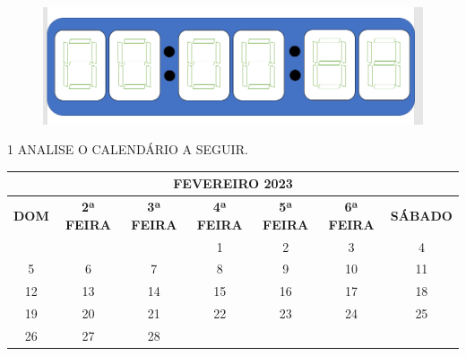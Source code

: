 \begin{figure}[htpb!]
\centering
\includegraphics[width=.8\textwidth]{media/image44.png}
\end{figure}


\pagebreak
{}

\num{1} ANALISE O CALENDÁRIO A SEGUIR.

\begin{center}
\begin{tabular}{|ccccccc|}
\hline
\multicolumn{7}{|c|}{\textbf{FEVEREIRO 2023}} \\ \hline
\multicolumn{1}{|c|}{\textbf{DOM}} & \multicolumn{1}{c|}{\textbf{2ª FEIRA}} & \multicolumn{1}{c|}{\textbf{3ª FEIRA}} & \multicolumn{1}{c|}{\textbf{4ª FEIRA}} & \multicolumn{1}{c|}{\textbf{5ª FEIRA}} & \multicolumn{1}{c|}{\textbf{6ª FEIRA}} & \textbf{SÁBADO} \\ \hline
\multicolumn{1}{|c|}{} & \multicolumn{1}{c|}{} & \multicolumn{1}{c|}{} & \multicolumn{1}{c|}{1} & \multicolumn{1}{c|}{2} & \multicolumn{1}{c|}{3} & 4 \\ \hline
\multicolumn{1}{|c|}{5} & \multicolumn{1}{c|}{6} & \multicolumn{1}{c|}{7} & \multicolumn{1}{c|}{8} & \multicolumn{1}{c|}{9} & \multicolumn{1}{c|}{10} & 11 \\ \hline
\multicolumn{1}{|c|}{12} & \multicolumn{1}{c|}{13} & \multicolumn{1}{c|}{14} & \multicolumn{1}{c|}{15} & \multicolumn{1}{c|}{16} & \multicolumn{1}{c|}{17} & 18 \\ \hline
\multicolumn{1}{|c|}{19} & \multicolumn{1}{c|}{20} & \multicolumn{1}{c|}{21} & \multicolumn{1}{c|}{22} & \multicolumn{1}{c|}{23} & \multicolumn{1}{c|}{24} & 25 \\ \hline
\multicolumn{1}{|c|}{26} & \multicolumn{1}{c|}{27} & \multicolumn{1}{c|}{28} & \multicolumn{1}{c|}{} & \multicolumn{1}{c|}{} & \multicolumn{1}{c|}{} &  \\ \hline
\end{tabular}
\end{center}

